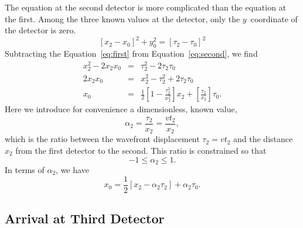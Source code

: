 \documentclass[twocolumn]{article}
\begin{document}
The equation at the second detector is more complicated than the equation at
the first.  Among the three known values at the detector, only the
$y$~coordinate of the detector is zero.
\begin{equation}
   \left[x_2 - x_0\right]^2 + y_0^2 = \left[\tau_2 - \tau_0\right]^2
   \label{eq:second}
\end{equation}
Subtracting the Equation~\ref{eq:first} from Equation~\ref{eq:second}, we find
\begin{eqnarray}
   \nonumber
   x_2^2 - 2 x_2 x_0 &=& \tau_2^2 - 2 \tau_2 \tau_0\\
   \nonumber
   2 x_2 x_0 &=& x_2^2 - \tau_2^2 + 2 \tau_2 \tau_0\\
   x_0 &=& \frac{1}{2}\left[1 - \frac{\tau_2^2}{x_2^2}\right] x_2 +
           \left[\frac{\tau_2}{x_2}\right] \tau_0.
\end{eqnarray}
Here we introduce for convenience a dimensionless, known value,
\begin{equation}
   \alpha_2 = \frac{\tau_2}{x_2} = \frac{v t_2}{x_2},
\end{equation}
which is the ratio between the wavefront displacement $\tau_2 = vt_2$ and the
distance $x_2$ from the first detector to the second.  This ratio is constrained
so that
\begin{equation}
   -1 \leq \alpha_2 \leq 1.
\end{equation}
In terms of $\alpha_2$, we have
\begin{equation}
   x_0 = \frac{1}{2}\left[x_2 - \alpha_2\tau_2\right] + \alpha_2\tau_0.
   \label{eq:t-x}
\end{equation}

\subsection{Arrival at Third Detector}
\end{document}

